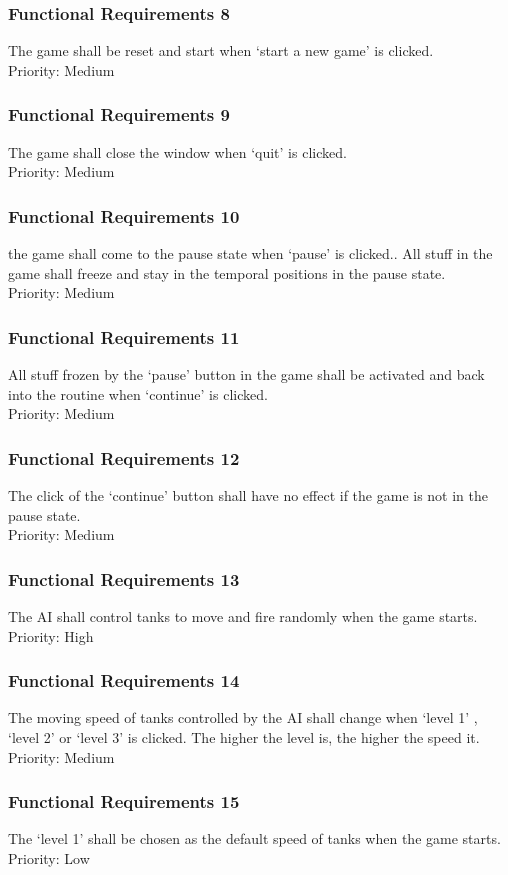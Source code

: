 \documentclass[12pt, titlepage]{article}
\begin{document}
\subsubsection{Functional Requirements 8} The game shall be reset and start when `start a new game' is clicked.\\Priority: Medium
\subsubsection{Functional Requirements 9} The game shall close the window when `quit' is clicked.\\Priority: Medium
\subsubsection{Functional Requirements 10} the game shall come to the pause state when `pause' is clicked.. All stuff 
in the game shall freeze and stay in the temporal positions in the pause state.\\Priority: Medium
\subsubsection{Functional Requirements 11} All stuff frozen by the `pause' button in the game shall be activated and
 back into the routine when `continue' is clicked.\\Priority: Medium
\subsubsection{Functional Requirements 12} The click of the `continue' button shall have no effect if the game is not
 in the pause state.\\Priority: Medium
\subsubsection{Functional Requirements 13} The AI shall control tanks to move and fire randomly when the game starts.\\Priority: High
\subsubsection{Functional Requirements 14} The moving speed of tanks controlled by the AI shall change when `level 1'
, `level 2' or `level 3' is clicked. The higher the level is, the higher the speed
 it.\\Priority: Medium
\subsubsection{Functional Requirements 15} The `level 1' shall be chosen as the default speed of tanks when the game 
starts.\\Priority: Low
\end{document}
